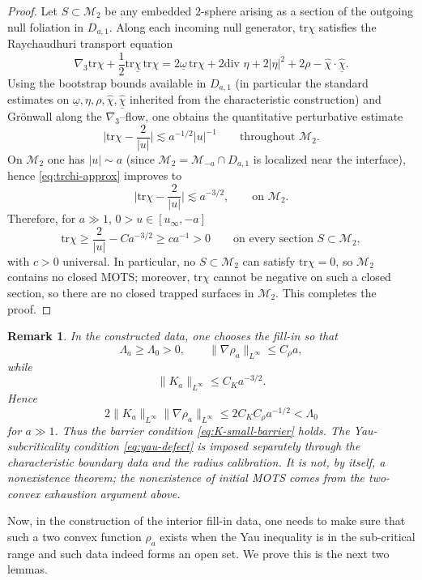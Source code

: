 \documentclass{amsart}
\newtheorem{remark}{Remark}
\renewcommand{\div}{\mbox{div }}
\newcommand{\tr}{\mbox{tr}}
\begin{document}
{\begin{proof}
\medskip
\noindent Let $S\subset \mathcal M_2$ be any embedded $2$-sphere arising as a section of the outgoing null foliation in $D_{a,1}$. Along each incoming null generator, $\tr\chi$ satisfies the Raychaudhuri transport equation
\begin{equation}\label{eq:ray-trchi}
\nabla_{3}\tr\chi+\frac{1}{2}\tr\underline{\chi}\,\tr\chi
=
2\underline{\omega}\,\tr\chi+2\div\eta+2|\eta|^{2}+2\rho-\hat{\chi}\cdot \underline{\hat{\chi}} .
\end{equation}
Using the bootstrap bounds available in $D_{a,1}$ (in particular the standard estimates on $\underline{\omega},\eta,\rho,\hat\chi,\underline{\hat\chi}$ inherited from the characteristic construction) and Grönwall along the $\nabla_3$--flow, one obtains the quantitative perturbative estimate
\begin{equation}\label{eq:trchi-approx}
\Big|\tr\chi-\frac{2}{|u|}\Big|
\lesssim a^{-1/2}|u|^{-1}
\qquad\text{throughout }\mathcal M_2 .
\end{equation}
On $\mathcal M_2$ one has $|u|\sim a$ (since $\mathcal M_2=\mathcal M_{-a}\cap D_{a,1}$ is localized near the interface), hence \eqref{eq:trchi-approx} improves to
\begin{equation}\label{eq:trchi-approx-a}
\Big|\tr\chi-\frac{2}{|u|}\Big|
\lesssim a^{-3/2},
\qquad\text{on }\mathcal M_2 .
\end{equation}
Therefore, for $a\gg1$, $0>u\in[u_{\infty},-a]$
\[
\tr\chi \ge \frac{2}{|u|}-C a^{-3/2} \ge c a^{-1}>0
\qquad\text{on every section }S\subset\mathcal M_2,
\]
with $c>0$ universal. In particular, no $S\subset\mathcal M_2$ can satisfy $\tr\chi=0$, so $\mathcal M_2$ contains no closed MOTS; moreover, $\tr\chi$ cannot be negative on such a closed section, so there are no closed trapped surfaces in $\mathcal M_2$. This completes the proof. 
\end{proof}

\begin{remark}
In the constructed data, one chooses the fill-in so that
\[
        \Lambda_a\ge \Lambda_0>0,
        \qquad
        \|\nabla\rho_a\|_{L^\infty}\le C_\rho a,
\]
while
\[
        \|K_a\|_{L^\infty}\le C_K a^{-3/2}.
\]
Hence
\[
        2\|K_a\|_{L^\infty}\|\nabla\rho_a\|_{L^\infty}
        \le
        2C_KC_\rho a^{-1/2}
        <
        \Lambda_0
\]
for \(a\gg1\). Thus the barrier condition
\eqref{eq:K-small-barrier} holds. The Yau-subcriticality condition
\eqref{eq:yau-defect} is imposed separately through the
characteristic boundary data and the radius calibration. It is not, by
itself, a nonexistence theorem; the nonexistence of initial MOTS comes
from the two-convex exhaustion argument above.
\end{remark}
\noindent Now, in the construction of the interior fill-in data, one needs to make sure that such a two convex function $\rho_{a}$ exists when the Yau inequality is in the sub-critical range and such data indeed forms an open set. We prove this is the next two lemmas.  

}
\end{document}

